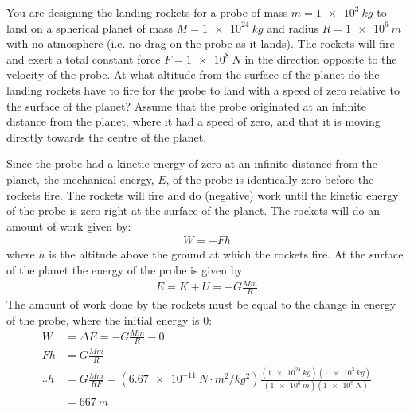 \question You are designing the landing rockets for a probe of mass $m=\SI{1e3}{kg}$ to land on a spherical planet of mass $M=\SI{1e24}{kg}$ and radius $R=\SI{1e6}{m}$ with no atmosphere (i.e. no drag on the probe as it lands). The rockets will fire and exert a total constant force $F=\SI{1e8}{N}$ in the direction opposite to the velocity of the probe. At what altitude from the surface of the planet do the landing rockets have to fire for the probe to land with a speed of zero relative to the surface of the planet? Assume that the probe originated at an infinite distance from the planet, where it had a speed of zero, and that it is moving directly towards the centre of the planet.
\begin{solution}
Since the probe had a kinetic energy of zero at an infinite distance from the planet, the mechanical energy, $E$, of the probe is identically zero before the rockets fire. The rockets will fire and do (negative) work until the kinetic energy of the probe is zero right at the surface of the planet. The rockets will do an amount of work given by:
\begin{align*}
W=-Fh
\end{align*}
where $h$ is the altitude above the ground at which the rockets fire. At the surface of the planet the energy of the probe is given by:
\begin{align*}
E=K+U=-G\frac{Mm}{R}
\end{align*}
The amount of work done by the rockets must be equal to the change in energy of the probe, where the initial energy is 0:
\begin{align*}
W&=\Delta E=-G\frac{Mm}{R}-0\\
Fh &= G\frac{Mm}{R}\\
\therefore h &= G\frac{Mm}{RF}= (\SI{6.67e-11}{N\cdot m^2/kg^2})\frac{(\SI{1e24}{kg})(\SI{1e3}{kg})}{(\SI{1e6}{m})(\SI{1e8}{N})}\\
&=\SI{667}{m}
\end{align*}
\end{solution}



